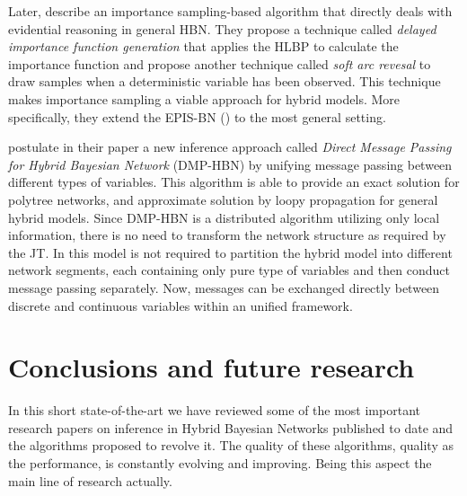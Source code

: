 \documentclass[a4paper,11pt]{article}
\begin{document}
Later, \cite{yuanmarek2007}  describe an importance sampling-based algorithm that directly deals with evidential reasoning in general HBN. They propose a technique called \textit{delayed importance function generation} that applies the HLBP to calculate the importance function and propose another technique called \textit{soft arc revesal} to draw samples when a deterministic variable has been observed. This technique makes importance sampling a viable approach for hybrid models. More specifically, they extend the EPIS-BN (\cite{yuandruzdzel2006}) to the most general setting. 

\cite{scalable2010} postulate in their paper a new inference approach called \textit{Direct Message Passing for Hybrid Bayesian Network} (DMP-HBN) by unifying message passing between different types of variables. This algorithm is able to provide an exact solution for polytree networks, and approximate solution by loopy propagation for general hybrid models. 
Since DMP-HBN is a distributed algorithm utilizing only local information, there is no need to transform the network structure as required by the JT.  In this model is not required to partition the hybrid model into different network segments, each containing only pure type of variables and then conduct message passing separately. Now, messages can be exchanged directly between discrete and continuous variables within an unified framework.

\section{Conclusions and future research}

In this short state-of-the-art we have reviewed some of the most important research papers on inference in Hybrid Bayesian Networks published to date and the algorithms proposed to revolve it.
The quality of these algorithms, quality as the performance, is constantly evolving and improving. Being this aspect the main line of research actually.
\end{document}

